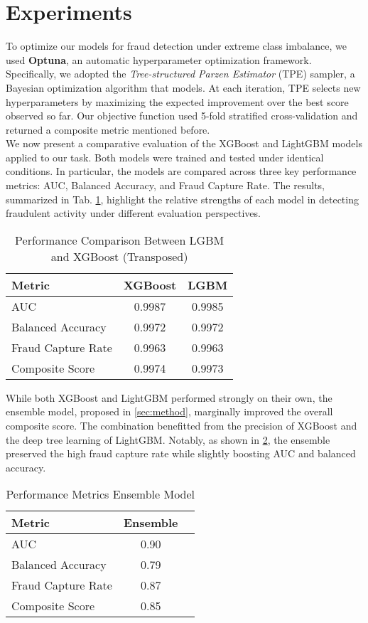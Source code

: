 \documentclass[a4paper]{article}
\begin{document}
\section{Experiments}
\label{sec:experiments}
To optimize our models for fraud detection under extreme class imbalance, we used \textbf{Optuna}, an automatic hyperparameter optimization framework. Specifically, we adopted the \textit{Tree-structured Parzen Estimator} (TPE) sampler, a Bayesian optimization algorithm that models. At each iteration, TPE selects new hyperparameters by maximizing the expected improvement over the best score observed so far. Our objective function used 5-fold stratified cross-validation and returned a composite metric mentioned before.\\
We now present a comparative evaluation of the XGBoost and LightGBM models applied to our task. Both models were trained and tested under identical conditions.  In particular, the models are compared across three key performance metrics: AUC, Balanced Accuracy, and Fraud Capture Rate. The results, summarized in Tab. \ref{tab:tabella}, highlight the relative strengths of each model in detecting fraudulent activity under different evaluation perspectives.
\begin{table}[h]
\label{tab:tabella}
\centering
\caption{Performance Comparison Between LGBM and XGBoost (Transposed)}
\begin{tabular}{lcc}
\hline
\textbf{Metric} & \textbf{XGBoost} & \textbf{LGBM} \\
\hline
AUC & 0.9987 & 0.9985 \\
Balanced Accuracy & 0.9972 & 0.9972 \\
Fraud Capture Rate & 0.9963 & 0.9963 \\
Composite Score & 0.9974 & 0.9973 \\
\hline
\end{tabular}
\end{table}
While both XGBoost and LightGBM performed strongly on their own, the ensemble model, proposed in \ref{sec:method}, marginally improved the overall composite score. The combination benefitted from the precision of XGBoost and the deep tree learning of LightGBM. Notably, as shown in \ref{tab:tabella2}, the ensemble preserved the high fraud capture rate while slightly boosting AUC and balanced accuracy.
\begin{table}[htbp]
\label{tab:tabella2}
\centering
\small
\caption{Performance Metrics Ensemble Model}
\begin{tabular}{lcc}
\hline
\textbf{Metric} & \textbf{Ensemble} \\
\hline
AUC & 0.90 \\
Balanced Accuracy & 0.79 \\
Fraud Capture Rate & 0.87 \\
Composite Score & 0.85 \\
\hline
\end{tabular}
\end{table}
\end{document}
